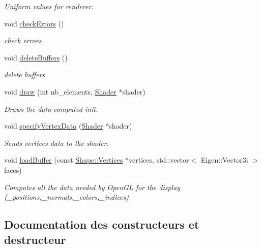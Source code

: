 \begin{DoxyCompactItemize}
\begin{DoxyCompactList}\small\item\em Uniform values for renderer. \end{DoxyCompactList}\item 
void \hyperlink{class_rendering___open_g_l_a9621079239b6b621dfc8f9c4e93bdd7a}{check\+Errors} ()
\begin{DoxyCompactList}\small\item\em check errors \end{DoxyCompactList}\item 
void \hyperlink{class_rendering___open_g_l_aab5b195bb52751243f4944417f9ae7d5}{delete\+Buffers} ()
\begin{DoxyCompactList}\small\item\em delete buffers \end{DoxyCompactList}\item 
void \hyperlink{class_rendering___open_g_l_a94abb636d4264637628e4b9b97c087d2}{draw} (int nb\+\_\+elements, \hyperlink{class_shader}{Shader} $\ast$shader)
\begin{DoxyCompactList}\small\item\em Draws the data computed init. \end{DoxyCompactList}\item 
void \hyperlink{class_rendering___open_g_l_a8ad1a3e698d694782f4174d94b745cd5}{specify\+Vertex\+Data} (\hyperlink{class_shader}{Shader} $\ast$shader)
\begin{DoxyCompactList}\small\item\em Sends vertices data to the shader. \end{DoxyCompactList}\item 
void \hyperlink{class_rendering___open_g_l_aee7a6085edb4e6927282067b6cde59bf}{load\+Buffer} (const \hyperlink{struct_shape_1_1_vertices}{Shape\+::\+Vertices} $\ast$vertices, std\+::vector$<$ Eigen\+::\+Vector3i $>$ faces)
\begin{DoxyCompactList}\small\item\em Computes all the data needed by Open\+GL for the display (\+\_\+positions,\+\_\+normals,\+\_\+colors,\+\_\+indices) \end{DoxyCompactList}\end{DoxyCompactItemize}


\subsection{Documentation des constructeurs et destructeur}
\mbox{\label{class_rendering___open_g_l_a0db708eaeae23e85a18d9c40995b27ae}} 
